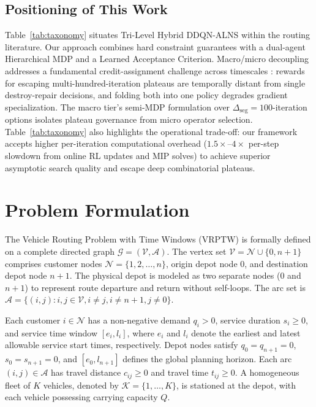 \documentclass{ieeeaccess}
\begin{document}
\subsection{Positioning of This Work}
\label{sec:rw_positioning}

Table~\ref{tab:taxonomy} situates Tri-Level Hybrid DDQN-ALNS within the routing literature. Our approach combines hard constraint guarantees with a dual-agent Hierarchical MDP and a Learned Acceptance Criterion. Macro/micro decoupling addresses a fundamental credit-assignment challenge across timescales \cite{sutton1999between}: rewards for escaping multi-hundred-iteration plateaus are temporally distant from single destroy-repair decisions, and folding both into one policy degrades gradient specialization. The macro tier's semi-MDP formulation over $\Delta_{\text{seg}}=100$-iteration options isolates plateau governance from micro operator selection. Table~\ref{tab:taxonomy} also highlights the operational trade-off: our framework accepts higher per-iteration computational overhead ($1.5\times\text{--}4\times$ per-step slowdown from online RL updates and MIP solves) to achieve superior asymptotic search quality and escape deep combinatorial plateaus.

\section{Problem Formulation}
\label{sec:formulation}

The Vehicle Routing Problem with Time Windows (VRPTW) is formally defined on a complete directed graph $\mathcal{G} = (\mathcal{V}, \mathcal{A})$. The vertex set $\mathcal{V} = \mathcal{N} \cup \{0, n+1\}$ comprises customer nodes $\mathcal{N} = \{1, 2, \dots, n\}$, origin depot node $0$, and destination depot node $n+1$. The physical depot is modeled as two separate nodes ($0$ and $n+1$) to represent route departure and return without self-loops. The arc set is $\mathcal{A} = \{(i, j) : i, j \in \mathcal{V}, i \neq j, i \neq n+1, j \neq 0\}$.

Each customer $i \in \mathcal{N}$ has a non-negative demand $q_i > 0$, service duration $s_i \ge 0$, and service time window $[e_i, l_i]$, where $e_i$ and $l_i$ denote the earliest and latest allowable service start times, respectively. Depot nodes satisfy $q_0 = q_{n+1} = 0$, $s_0 = s_{n+1} = 0$, and $[e_0, l_{n+1}]$ defines the global planning horizon. Each arc $(i, j) \in \mathcal{A}$ has travel distance $c_{ij} \ge 0$ and travel time $t_{ij} \ge 0$. A homogeneous fleet of $K$ vehicles, denoted by $\mathcal{K} = \{1, \dots, K\}$, is stationed at the depot, with each vehicle possessing carrying capacity $Q$.
\end{document}
